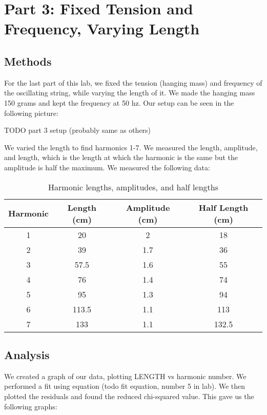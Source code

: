 \documentclass[11pt]{article}
\let\oldsection\section
\renewcommand\section{\clearpage\oldsection}
\begin{document}
    \section{Part 3: Fixed Tension and Frequency, Varying Length}\label{sec:part_3}
    \subsection{Methods}\label{subsec:part_3_methods}
    For the last part of this lab, we fixed the tension (hanging mass) and frequency of the oscillating string, while varying the length of it. We made the hanging mass 150 grams and kept the frequency at 50 hz. Our setup can be seen in the following picture:

    TODO part 3 setup (probably same as others)

    We varied the length to find harmonics 1-7. We measured the length, amplitude, and length, which is the length at which the harmonic is the same but the amplitude is half the maximum. We measured the following data:

    \begin{table}[h]
    \centering
    \begin{tabular}{|c|c|c|c|}
    \hline
    \textbf{Harmonic} & \textbf{Length (cm)} & \textbf{Amplitude (cm)} & \textbf{Half Length (cm)} \\
    \hline
    1 & 20 & 2 & 18 \\
    2 & 39 & 1.7 & 36 \\
    3 & 57.5 & 1.6 & 55 \\
    4 & 76 & 1.4 & 74 \\
    5 & 95 & 1.3 & 94 \\
    6 & 113.5 & 1.1 & 113 \\
    7 & 133 & 1.1 & 132.5 \\
    \hline
    \end{tabular}
    \caption{Harmonic lengths, amplitudes, and half lengths}
    \label{tab:harmonic_lengths}
    \end{table}
    
    \subsection{Analysis}\label{subsec:part_3_analysis}
    We created a graph of our data, plotting LENGTH vs harmonic number. We performed a fit using equation (todo fit equation, number 5 in lab). We then plotted the residuals and found the reduced chi-squared value. This gave us the following graphs:
\end{document}
